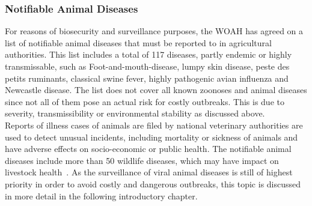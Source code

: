 \subsubsection*{Notifiable Animal Diseases}
For reasons of biosecurity and surveillance purposes, the WOAH has agreed on a list of notifiable animal diseases that must be reported to in agricultural authorities. This list includes a total of 117 diseases, partly endemic or highly transmissable, such as Foot-and-mouth-disease, lumpy skin disease, peste des petits ruminants, classical swine fever, highly pathogenic avian influenza and Newcastle disease. The list does not cover all known zoonoses and animal diseases since not all of them pose an actual risk for costly outbreaks. This is due to severity, transmissibility or environmental stability as discussed above.\\
Reports of illness cases of animals are filed by national veterinary authorities are used to detect unusual incidents, including mortality or sickness of animals and have adverse effects on socio-economic or public health. The notifiable animal diseases include more than 50 wildlife diseases, which may have impact on livestock health~\cite{woah2023list}. As the surveillance of viral animal diseases is still of highest priority in order to avoid costly and dangerous outbreaks, this topic is discussed in more detail in the following introductory chapter.


